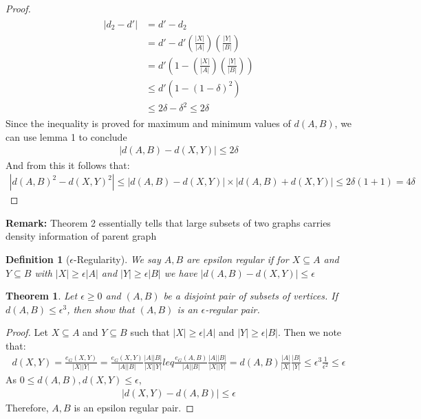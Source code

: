 \documentclass{article}
\newtheorem{theorem}{Theorem}[]
\newtheorem{definition}{Definition}[]
\begin{document}
\begin{proof}
\begin{align}
\begin{split}
		|d_2-d'|&=d'-d_2\\
		&=d'-d'\left(\frac{|X|}{|A|}\right)\left(\frac{|Y|}{|B|}\right)\\
		&=d'\left(1-\left(\frac{|X|}{|A|}\right)\left(\frac{|Y|}{|B|}\right)\right)\\
		&\leq  d'\left(1-(1-\delta)^2\right)\\
		&\leq  2\delta-\delta^2\leq  2\delta
	\end{split}
\end{align}
Since the inequality is proved for maximum and minimum values of $d(A,B)$, we can use lemma 1 to conclude 
\begin{align}
	|d(A,B)-d(X,Y)|\leq  2\delta
\end{align}
And from this it follows that:
\begin{align}
	|d(A,B)^2-d(X,Y)^2|\leq  |d(A,B)-d(X,Y)|\times|d(A,B)+d(X,Y)|\leq  2\delta(1+1)=4\delta
\end{align}
\end{proof}\noindent
\textbf{Remark: }Theorem 2 essentially tells that large subsets of two graphs carries density information of  parent graph

\begin{definition}[$\epsilon$-Regularity]
	We say $A,B$ are epsilon regular if for $X\subseteq A$ and $Y\subseteq B$ with $|X|\geq \epsilon|A|$ and $|Y|\geq \epsilon|B|$ we have $|d(A,B)-d(X,Y)|\leq  \epsilon$
\end{definition}



\begin{theorem}
	Let $\epsilon \geq  0$ and $(A, B)$ be a disjoint pair of subsets of vertices. If $d(A, B) \leq \epsilon^3$, then show that $(A, B)$ is an $\epsilon$-regular pair.
\end{theorem}
\begin{proof}
	Let $X\subseteq A$ and $Y\subseteq B$ such that $|X|\geq \epsilon|A|$ and $|Y|\geq \epsilon|B|$. Then we note that:
	\begin{align}
		d(X,Y)=\frac{e_G(X,Y)}{|X||Y|}=\frac{e_G(X,Y)}{|A||B|}\frac{|A||B|}{|X||Y|}leq \frac{e_G(A,B)}{|A||B|}\frac{|A||B|}{|X||Y|}=d(A,B)\frac{|A|}{|X|}\frac{|B|}{|Y|}\leq\epsilon^3\frac{1}{\epsilon^2}\leq \epsilon
	\end{align}
	As $0\leq d(A,B),d(X,Y)\leq \epsilon$,
	\begin{align}
		|d(X,Y)-d(A,B)|\leq\epsilon
	\end{align}
	Therefore, $A,B$ is an epsilon regular pair. 
\end{proof}
\end{document}
